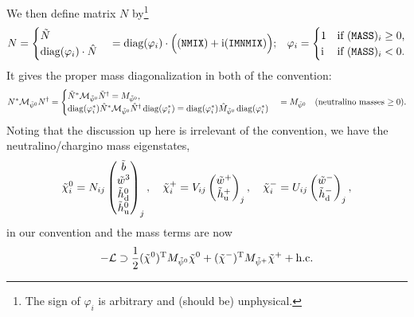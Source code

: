 \documentclass[CheatSheet]{subfiles}
\begin{document}
We then define matrix $N$ by\footnote{The sign of $\varphi_i$ is arbitrary and (should be) unphysical.}
\begin{align}
 &N = \begin{cases}
  \tilde N\\
  \operatorname{\mathrm{diag}}(\varphi_i) \cdot \hat N
  \end{cases}
   = \operatorname{\mathrm{diag}}(\varphi_i) \cdot\Bigl(\text{(\texttt{NMIX})} + \mathrm{i}\text{(\texttt{IMNMIX})}\Bigr);
  &\varphi_i = \begin{cases}
 1 & \text{if (\texttt{MASS})$_i\ge0$,}\\
 \mathrm{i} & \text{if (\texttt{MASS})$_i<0$.}
             \end{cases}
\end{align}
It gives the proper mass diagonalization in both of the  convention:
\begin{equation}
 N^*\mathcal M_{\tilde\psi^0}N^\dagger
=
\begin{cases}
 \tilde N^*\mathcal M_{\tilde\psi^0}\tilde N^\dagger = M_{\tilde\psi^0},\\
 \operatorname{\mathrm{diag}}(\varphi_i^*)\hat N^* \mathcal M_{\tilde\psi^0}\hat N^{\dagger}\operatorname{\mathrm{diag}}(\varphi_i^*)
 =
 \operatorname{\mathrm{diag}}(\varphi_i^*)\hat M_{\tilde\psi^0}\operatorname{\mathrm{diag}}(\varphi_i^*)
\end{cases}
 = M_{\tilde\psi^0}
 \quad\text{(neutralino masses $\ge 0$)}.
\end{equation}
Noting that the discussion up here is irrelevant of the convention, we have the neutralino/chargino mass eigenstates,
\begin{equation}
 \neut[i] = N_{ij} \pmat{\tib\\\tiw^3\\\thdz\\\thuz}_j,
\quad
 \charP[i] = V_{ij} \pmat{\tiw^+\\\thup}_j,
\quad
 \charM[i] = U_{ij} \pmat{\tiw^-\\\thdm}_j,
\end{equation}
in our convention and the mass terms are now
\begin{equation}
  -\mathcal L\supset
\frac12(\neut)^\TT M_{\tilde\psi^0} \neut
+ (\charM)^\TT M_{\tilde\psi^+}\charP + \text{h.c.}
\end{equation}
\end{document}
